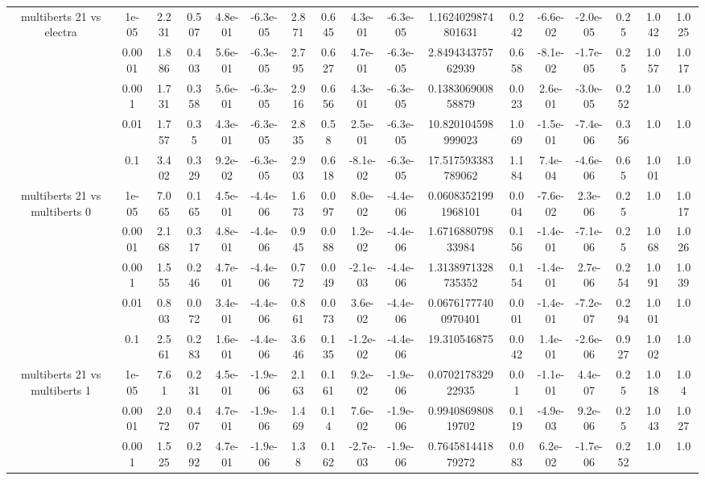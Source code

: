 \begin{tabular}{|c|c|c|c|c|c|c|c|c|c|c|c|c|c|c|c|c|}
\hline
\multirow{5}{*}{multiberts 21 vs electra } & 1e-05 & 2.231 & 0.507 & 4.8e-01 & -6.3e-05 & 2.871 & 0.645 & 4.3e-01 & -6.3e-05 & 1.1624029874801631 & 0.242 & -6.6e-02 & -2.0e-05 & 0.25 & 1.042 & 1.025 \\
 & 0.0001 & 1.886 & 0.403 & 5.6e-01 & -6.3e-05 & 2.795 & 0.627 & 4.7e-01 & -6.3e-05 & 2.849434375762939 & 0.658 & -8.1e-02 & -1.7e-05 & 0.25 & 1.057 & 1.017 \\
 & 0.001 & 1.731 & 0.358 & 5.6e-01 & -6.3e-05 & 2.916 & 0.656 & 4.3e-01 & -6.3e-05 & 0.138306900858879 & 0.023 & 2.6e-01 & -3.0e-05 & 0.252 & 1.0 & 1.0 \\
 & 0.01 & 1.757 & 0.35 & 4.3e-01 & -6.3e-05 & 2.835 & 0.58 & 2.5e-01 & -6.3e-05 & 10.820104598999023 & 1.069 & -1.5e-01 & -7.4e-06 & 0.356 & 1.0 & 1.0 \\
 & 0.1 & 3.402 & 0.329 & 9.2e-02 & -6.3e-05 & 2.903 & 0.618 & -8.1e-02 & -6.3e-05 & 17.517593383789062 & 1.184 & 7.4e-04 & -4.6e-06 & 0.65 & 1.001 & 1.0 \\
\hline
\multirow{5}{*}{multiberts 21 vs multiberts 0} & 1e-05 & 7.065 & 0.165 & 4.5e-01 & -4.4e-06 & 1.673 & 0.097 & 8.0e-02 & -4.4e-06 & 0.06083521991968101 & 0.004 & -7.6e-02 & 2.3e-06 & 0.25 & 1.0 & 1.017 \\
 & 0.0001 & 2.168 & 0.317 & 4.8e-01 & -4.4e-06 & 0.945 & 0.088 & 1.2e-02 & -4.4e-06 & 1.671688079833984 & 0.156 & -1.4e-01 & -7.1e-06 & 0.25 & 1.068 & 1.026 \\
 & 0.001 & 1.555 & 0.246 & 4.7e-01 & -4.4e-06 & 0.772 & 0.049 & -2.1e-03 & -4.4e-06 & 1.3138971328735352 & 0.154 & -1.4e-01 & 2.7e-06 & 0.254 & 1.091 & 1.039 \\
 & 0.01 & 0.803 & 0.072 & 3.4e-01 & -4.4e-06 & 0.861 & 0.073 & 3.6e-02 & -4.4e-06 & 0.06761777400970401 & 0.001 & -1.4e-01 & -7.2e-07 & 0.294 & 1.001 & 1.0 \\
 & 0.1 & 2.561 & 0.283 & 1.6e-01 & -4.4e-06 & 3.646 & 0.135 & -1.2e-02 & -4.4e-06 & 19.310546875 & 0.042 & 1.4e-01 & -2.6e-06 & 0.927 & 1.002 & 1.0 \\
\hline
\multirow{5}{*}{multiberts 21 vs multiberts 1} & 1e-05 & 7.61 & 0.231 & 4.5e-01 & -1.9e-06 & 2.163 & 0.161 & 9.2e-02 & -1.9e-06 & 0.070217832922935 & 0.01 & -1.1e-01 & 4.4e-07 & 0.25 & 1.018 & 1.04 \\
 & 0.0001 & 2.072 & 0.407 & 4.7e-01 & -1.9e-06 & 1.469 & 0.14 & 7.6e-02 & -1.9e-06 & 0.994086980819702 & 0.119 & -4.9e-03 & 9.2e-06 & 0.25 & 1.043 & 1.027 \\
 & 0.001 & 1.525 & 0.292 & 4.7e-01 & -1.9e-06 & 1.38 & 0.162 & -2.7e-03 & -1.9e-06 & 0.764581441879272 & 0.083 & 6.2e-02 & -1.7e-06 & 0.252 & 1.0 & 1.0 \\

\end{tabular}
